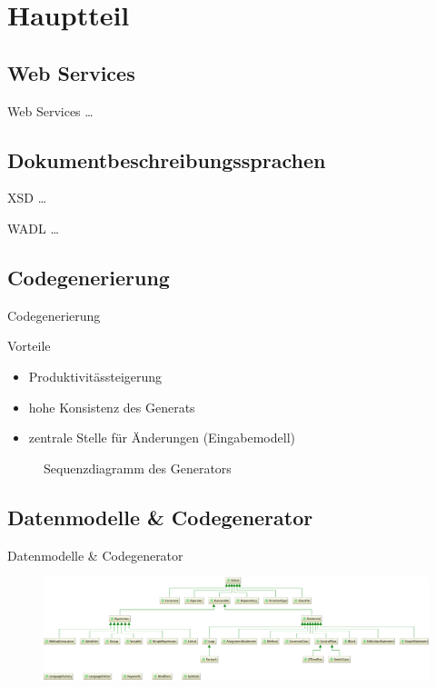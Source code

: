 \section{Hauptteil}

\subsection{Web Services}
\begin{frame}{Web Services}
    \ldots
\end{frame}

\subsection{Dokumentbeschreibungssprachen}
\begin{frame}{XSD}
    \ldots
\end{frame}

\begin{frame}{WADL}
    \ldots
\end{frame}

\subsection{Codegenerierung}
\begin{frame}{Codegenerierung}

    \begin{block}{Vorteile}
        \begin{itemize}
            \item Produktivitässteigerung
            \item hohe Konsistenz des Generats
            \item zentrale Stelle für Änderungen (Eingabemodell)
        \end{itemize}
    \end{block}
\end{frame}

\begin{frame}{}
    \begin{figure}
        \resizebox{\textwidth}{!}{
            
        }
        \caption{Sequenzdiagramm des Generators}
    \end{figure}
\end{frame}

\subsection{Datenmodelle \& Codegenerator}
\begin{frame}{Datenmodelle \& Codegenerator}
    \begin{figure}
        \includegraphics[width=\textwidth]{resources/languagemodel}
    \end{figure}
\end{frame}

